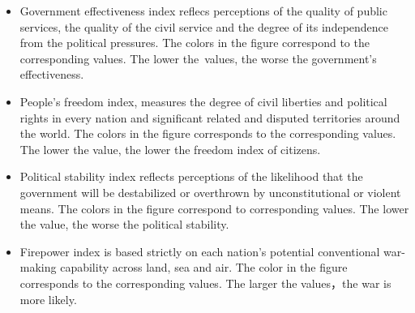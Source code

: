 \documentclass{mcmthesis}
\begin{document}
\begin{itemize}
  \item Government effectiveness index reflecs perceptions of the quality of public services, the quality of the civil service and the degree of its independence from the political pressures. The colors in the figure correspond to the corresponding values. The lower the values, the worse the government’s effectiveness.
  \item People's freedom index, measures the degree of civil liberties and political rights in every nation and significant related and disputed territories around the world. The colors in the figure corresponds to the corresponding values. The lower the value, the lower the freedom index of citizens.
  \item Political stability index reflects perceptions of the likelihood that the government will be destabilized or overthrown by unconstitutional or violent means. The colors in the figure correspond to corresponding values. The lower the value, the worse the political stability.
  \item Firepower index is based strictly on each nation's potential conventional war-making capability across land, sea and air. The color in the figure corresponds to the corresponding values. The larger the values，the war is more likely.
\end{itemize}
\end{document}
